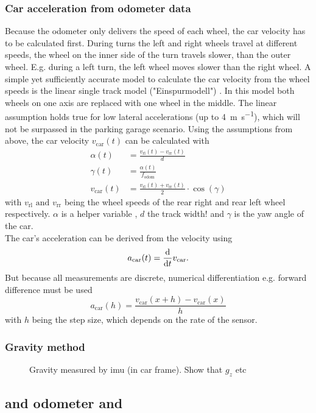 \subsubsection{Car acceleration from odometer data}
Because the odometer only delivers the speed of each wheel, the car velocity has to be calculated first.
During turns the left and right wheels travel at different speeds, the wheel on the inner side of the turn travels slower, than the outer wheel.
E.g. during a left turn, the left wheel moves slower than the right wheel.
A simple yet sufficiently accurate model to calculate the car velocity from the wheel speeds is the linear single track model ("Einspurmodell") \cite{Mitschke2014}.
In this model both wheels on one axis are replaced with one wheel in the middle.
The linear assumption holds true for low lateral accelerations (up to \SI{4}{\metre\per\second}), which will not be surpassed in the parking garage scenario.
Using the assumptions from above, the car velocity $v_\mathrm{car}(t)$ can be calculated with
\begin{align}
    \alpha(t) &= \frac{v_\mathrm{rl}(t) - v_\mathrm{rr}(t)}{d} \\
    \gamma(t) &= \frac{\alpha(t)}{f_\mathrm{odom}} \\
    v_\mathrm{car}(t) &= \frac{v_\mathrm{rl}(t) + v_\mathrm{rr}(t)}{2}\cdot\cos(\gamma)
\end{align}
with $v_\mathrm{rl} \text{ and } v_\mathrm{rr}$ being the wheel speeds of the rear right and rear left wheel respectively.
$\alpha$ is a helper variable , $d$ the track width! and $\gamma$ is the yaw angle of the car.\\
The car's acceleration can be derived from the velocity using
\begin{equation}
    a_\mathrm{car}(t) = \dv{t}v_\mathrm{car}.
\end{equation}
But because all measurements are discrete, numerical differentiation e.g. forward difference must be used
\begin{equation}
    a_\mathrm{car}(h) = \frac{v_\mathrm{car}(x + h) - v_\mathrm{car}(x)}{h}
\end{equation}
with $h$ being the step size, which depends on the rate of the sensor.

\subsubsection{Gravity method}
\begin{figure}[htpb]
    \centering
    
    \caption{Gravity measured by \acrshort{imu} (in car frame). Show that $g_z$ etc}
    \label{fig:tikz_car_gravity}
\end{figure}


\subsection{ and odometer and }
